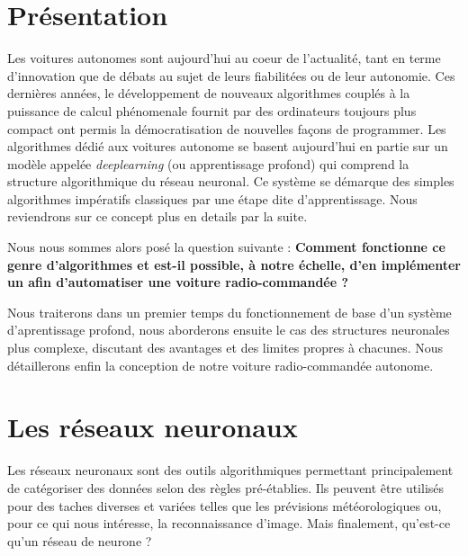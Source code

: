 \documentclass[12pt]{article}
\begin{document}
\iffalse
\thispagestyle{empty}
\center{\textbf{\huge{TIPE :}}}
\center{\textbf{\Huge{\underline{Réseaux de neurones}}}}
\center{\textbf{\Huge{\underline{et}}}}
\center{\textbf{\Huge{\underline{voiture autonome}}}}
\newpage
\fi

\tableofcontents
{}
\newpage



\section{Présentation}\label{section: \thesection}
Les voitures autonomes sont aujourd'hui au coeur de l'actualité, tant en terme d'innovation que de débats au sujet de leurs fiabilitées ou de leur autonomie. Ces dernières années, le développement de nouveaux algorithmes couplés à la puissance de calcul phénomenale fournit par des ordinateurs toujours plus compact ont permis la démocratisation de nouvelles façons de programmer. Les algorithmes dédié aux voitures autonome se basent aujourd'hui en partie sur un modèle appelée \textit{deeplearning} (ou apprentissage profond) qui comprend la structure algorithmique du réseau neuronal. Ce système se démarque des simples algorithmes impératifs classiques par une étape dite d'apprentissage. Nous reviendrons sur ce concept plus en details par la suite.

Nous nous sommes alors posé la question suivante : \textbf{Comment fonctionne ce genre d'algorithmes et est-il possible, à notre échelle, d'en implémenter un afin d'automatiser une voiture radio-commandée ?}

Nous traiterons dans un premier temps du fonctionnement de base d'un système d'aprentissage profond, nous aborderons ensuite le cas des structures neuronales plus complexe, discutant des avantages et des limites propres à chacunes. Nous détaillerons enfin la conception de notre voiture radio-commandée autonome.
\newpage


\section{Les réseaux neuronaux}\label{section: \thesection}

Les réseaux neuronaux sont des outils algorithmiques permettant principalement de catégoriser des données selon des règles pré-établies. Ils peuvent être utilisés pour des taches diverses et variées telles que les prévisions météorologiques ou, pour ce qui nous intéresse, la reconnaissance d'image. Mais finalement, qu'est-ce qu'un réseau de neurone ?
\end{document}
